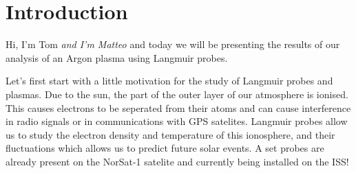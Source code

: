 \section{Introduction}

Hi, I'm Tom \emph{and I'm Matteo} and today we will be presenting the results of our analysis of an Argon plasma using Langmuir probes.

Let's first start with a little motivation for the study of Langmuir probes and plasmas. Due to the sun, the part of the outer layer of our atmosphere is ionised. This causes electrons to be seperated from their atoms and can cause interference in radio signals or in communications with GPS satelites. Langmuir probes allow us to study the electron density and temperature of this ionosphere, and their fluctuations which allows us to predict future solar events. A set probes are already present on the NorSat-1 satelite and currently being installed on the ISS!
